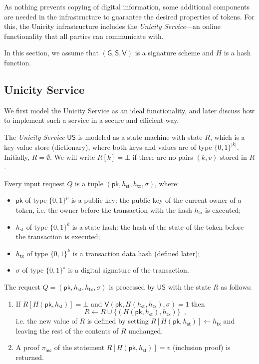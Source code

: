 \documentclass{article}
\newcommand{\bits}[1]{\{0,1\}^{#1}}
\newcommand{\keygen}[0]{\mathsf{G}}
\newcommand{\sig}[0]{\mathsf{S}}
\newcommand{\sigver}[0]{\mathsf{V}}
\newcommand{\pubkey}[0]{\mathsf{pk}}
\newcommand{\unisrv}[0]{\mathsf{US}}
\newcommand{\sthash}[0]{h_\mathsf{st}}
\newcommand{\txhash}[0]{h_\mathsf{tx}}
\newcommand{\pinc}[0]{\pi_{\mathsf{inc}}}
\begin{document}
As nothing prevents copying of digital information, some additional components are needed in the infrastructure to guarantee the desired properties of tokens. For this, the Unicity infrastructure includes the \emph{Unicity Service}---an online functionality that all parties can communicate with.


In this section, we assume that $(\keygen, \sig, \sigver)$ is a signature scheme and $H$ is a hash function.

\subsection{Unicity Service}

We first model the Unicity Service as an ideal functionality, and later discuss how to implement such a service in a secure and efficient way.

The \emph{Unicity Service} $\unisrv$ is modeled as a state machine with state $R$, which is a key-value store (dictionary), where both keys and values are of type $\bits{|k|}$. Initially, $R = \emptyset$. We will write $R[k] = \bot$ if there are no pairs $(k, v)$ stored in $R$.

Every input request $Q$ is a tuple $(\pubkey, \sthash, \txhash, \sigma)$, where:
\begin{itemize}
\item $\pubkey$ of type $\bits{p}$ is a public key: the public key of the current owner of a token, i.e. the owner before the transaction with the hash $\txhash$ is executed;
\item $\sthash$ of type $\bits{k}$ is a state hash: the hash of the state of the token before the transaction is executed;
\item $\txhash$ of type $\bits{k}$ is a transaction data hash (defined later);
\item $\sigma$ of type $\bits{s}$ is a digital signature of the transaction.
\end{itemize}

\noindent The request $Q=(\pubkey,\sthash,\txhash,\sigma)$ is processed by $\unisrv$ with the state $R$ as follows:
\begin{enumerate}
\item If $R[H(\pubkey, \sthash)] = \bot$ and $\sigver(\pubkey, H(\sthash, \txhash), \sigma) = 1$ then
\[
R \gets R \cup \{(H(\pubkey, \sthash), \txhash)\} \enspace,
\]
i.e. the new value of $R$ is defined by setting $R[H(\pubkey, \sthash)] \gets \txhash$ and leaving the rest of the contents of $R$ unchanged.
\item A proof $\pinc$ of the statement $R[H(\pubkey, \sthash)] = v$ (inclusion proof) is returned.
\end{enumerate}
\end{document}
